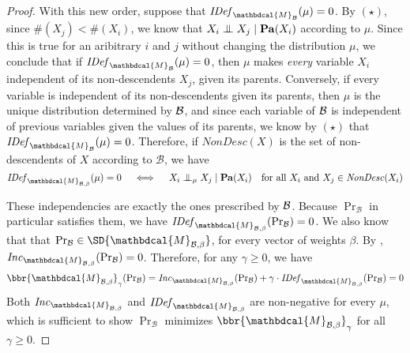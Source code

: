 \documentclass[letterpaper]{article} %
\theoremstyle{plain}
\theoremstyle{definition}
\theoremstyle{remark}
\let\H\relax
\DeclareMathOperator{\H}{\mathrm{H}} %
\newcommand{\CI}{\mathrel{\perp\mspace{-10mu}\perp}} %
\newcommand{\dg}[1]{\mathbdcal{#1}}
\newcommand\Pa{\mathbf{Pa}}
\newcommand{\IDef}[1]{\mathit{IDef}_{#1}}
\newcommand\Inc{\mathit{Inc}}
\newcommand{\PDGof}[1]{{\dg M}_{#1}}
\begin{document}
\begin{proof}
{	
	With this new order, suppose that 
	$\IDef{\PDGof{\cal B}}(\mu) = 0$.
	By $(\star)$, since $\#(X_j) < \#(X_i)$, we know that $X_i \CI X_j \mid \Pa(X_i)$ according to $\mu$. Since this is true for an aribitrary $i$ and $j$ without changing the distribution $\mu$, we conclude that if
	$\IDef{\PDGof{\cal B}}(\mu) = 0$, 
	then $\mu$ makes \emph{every} variable $X_i$ independent of its non-descendents $X_j$, given its parents.
	Conversely, if every variable is independent of its non-descendents given its parents, then $\mu$ is the unique distribution determined by $\cal B$, and since each variable of $\cal B$ is independent of previous variables given the values of its parents,  we know by $(\star)$ that
	$\IDef{\PDGof{\cal B}}(\mu) = 0$. 
	Therefore, if $\mathit{NonDesc}(X)$ is the set of non-descendents of $X$ according to $\mathcal B$, we have
\begin{equation}\label{eq:idef-bn-indeps}
 	\IDef{\PDGof{\mathcal B,\beta}}(\mu) = 0 \quad\iff\quad X_i \CI_\mu X_j \mid \Pa(X_i) \quad\text{for all $X_i$ and $X_j \in \mathit{NonDesc}(X_i)$} 
\end{equation}

These independencies are exactly the ones prescribed by $\cal B$.
Because $\Pr_{\mathcal B}$ in particular satisfies them,
we have $\IDef{\PDGof{\mathcal B,\beta}}(\Pr_{\cal B}) = 0$.
We also know that that $\Pr_{\cal B} \in \SD{\PDGof{\mathcal B,\beta}}$, for
every vector of weights $\beta$. By ,
$\Inc_{\PDGof{\mathcal B,\beta}}(\Pr_{\mathcal B}) = 0$. Therefore, for any
$\gamma \geq 0$, we have
\[ \bbr{\PDGof{\mathcal B, \beta}}_\gamma(\Pr\nolimits_{\cal B})
	= \Inc_{\PDGof{\mathcal B,\beta}}(\Pr\nolimits_{\mathcal B}) + \gamma \cdot
	\IDef{\PDGof{\mathcal B, \beta}}(\Pr\nolimits_{\cal B}) = 0
\]
Both $\Inc_{\PDGof{\mathcal B,\beta}}$ and $\IDef{\PDGof{\mathcal B, \beta}}$
are non-negative for every $\mu$, which is sufficient to show $\Pr_{\mathcal B}$
minimizes $\bbr{\PDGof{\mathcal B, \beta}}_\gamma$ for all $\gamma \geq 0$. 

}
\end{proof}
\end{document}

